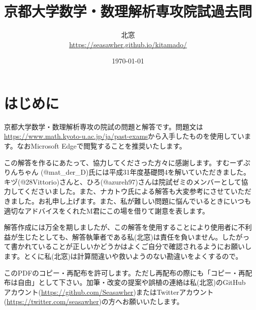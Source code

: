 \documentclass[10pt]{jsarticle}%
\begin{document}
\title{京都大学数学・数理解析専攻院試過去問}
\author{北窓 \\ \url{https://seasawher.github.io/kitamado/} }
\date{\today}
\maketitle




\tableofcontents%
\newpage



\section{はじめに}

京都大学数学・数理解析専攻の院試の問題と解答です。問題文は\url{https://www.math.kyoto-u.ac.jp/ja/past-exams}から入手したものを使用しています。なおMicrosoft Edgeで閲覧することを推奨いたします。

この解答を作るにあたって、協力してくださった方々に感謝します。すむーずぷりんちゃん (@mat\_der\_D)氏には平成31年度基礎問4を解いていただきました。キヅ(@28Vittorio)さんと、ひろ(@azureh97)さんは院試ゼミのメンバーとして協力してくださいました。また、ナカトウ氏による解答も大変参考にさせていただきました。お礼申し上げます。また、私が難しい問題に悩んでいるときにいつも適切なアドバイスをくれたM君にこの場を借りて謝意を表します。

解答作成には万全を期しましたが、この解答を使用することにより使用者に不利益が生じたとしても、解答執筆者である私(北窓)は責任を負いません。したがって書かれていることが正しいかどうかはよくご自分で確認されるようにお願いします。とくに私(北窓)は計算間違いや救いようのない勘違いをよくするので。

このPDFのコピー・再配布を許可します。ただし再配布の際にも「コピー・再配布は自由」として下さい。加筆・改変の提案や誤植の連絡は私(北窓)のGitHubアカウント(\url{https://github.com/Seasawher})またはTwitterアカウント(\url{https://twitter.com/seasawher})の方へお願いいたします。


\newpage





\newpage



\newpage



\newpage



\newpage
\end{document}
